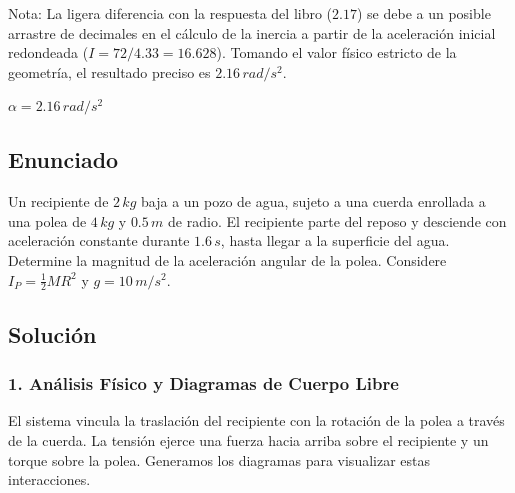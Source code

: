 \documentclass[12pt, a4paper]{article}
\begin{document}
Nota: La ligera diferencia con la respuesta del libro ($2.17$) se debe a un posible arrastre de decimales en el cálculo de la inercia a partir de la aceleración inicial redondeada ($I = 72 / 4.33 = 16.628$). Tomando el valor físico estricto de la geometría, el resultado preciso es $2.16 \, \si{rad/s^2}$.

\begin{tcolorbox}[colback=green!5!white, colframe=green!50!black, title=Respuesta Final]
\centering \Large $\alpha = 2.16 \, \si{rad/s^2}$
\end{tcolorbox}

\newpage

\subsection*{Enunciado}
Un recipiente de $2 \, \si{kg}$ baja a un pozo de agua, sujeto a una cuerda enrollada a una polea de $4 \, \si{kg}$ y $0.5 \, \si{m}$ de radio. El recipiente parte del reposo y desciende con aceleración constante durante $1.6 \, \si{s}$, hasta llegar a la superficie del agua. Determine la magnitud de la aceleración angular de la polea. Considere $I_P = \frac{1}{2} M R^2$ y $g = 10 \, \si{m/s^2}$.

\begin{center}
\end{center}

\subsection*{Solución}

\subsubsection*{1. Análisis Físico y Diagramas de Cuerpo Libre}
El sistema vincula la traslación del recipiente con la rotación de la polea a través de la cuerda. La tensión ejerce una fuerza hacia arriba sobre el recipiente y un torque sobre la polea. Generamos los diagramas para visualizar estas interacciones.
\end{document}
